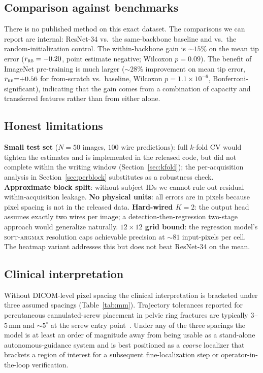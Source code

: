 \documentclass[conference,10pt,letterpaper]{IEEEtran}
\newcommand{\rnt}{ResNet-34}
\newcommand{\softargmax}{\textsc{soft-argmax}}
\begin{document}
\subsection{Comparison against benchmarks}
There is no published method on this exact dataset. The comparisons we
can report are internal: \rnt{} vs.\ the same-backbone baseline and
vs.\ the random-initialization control. The within-backbone gain is
$\sim 15\%$ on the mean tip error ($r_\textsc{rb}=-0.20$, point
estimate negative; Wilcoxon $p{=}0.09$). The benefit of ImageNet
pre-training is much larger ($\sim 28\%$ improvement on mean tip error,
$r_\textsc{rb}{=}{+}0.56$ for from-scratch vs.\ baseline, Wilcoxon
$p{=}1.1{\times}10^{-6}$, Bonferroni-significant), indicating that the
gain comes from a combination of capacity and transferred features
rather than from either alone.

\subsection{Honest limitations}
\textbf{Small test set} ($N{=}50$ images, $100$ wire predictions): full
$k$-fold CV would tighten the estimates and is implemented in the
released code, but did not complete within the writing window
(Section~\ref{sec:kfold}); the per-acquisition analysis in
Section~\ref{sec:perblock} substitutes as a robustness check.
\textbf{Approximate block split}: without subject IDs we cannot rule
out residual within-acquisition leakage. \textbf{No physical units}:
all errors are in pixels because pixel spacing is not in the released
data. \textbf{Hard-wired $K{=}2$}: the output head assumes exactly two
wires per image; a detection-then-regression two-stage approach would
generalize naturally. \textbf{$12{\times}12$ grid bound}: the regression
model's \softargmax{} resolution caps achievable precision at
$\sim 81$ input-pixels per cell. The heatmap variant addresses this
but does not beat \rnt{} on the mean.

\subsection{Clinical interpretation}
\label{sec:clinical}
Without DICOM-level pixel spacing the clinical interpretation is
bracketed under three assumed spacings (Table~\ref{tab:mm}). Trajectory
tolerances reported for percutaneous cannulated-screw placement in
pelvic ring fractures are typically $3$--$5\,$mm and $\sim 5^\circ$ at
the screw entry point~\cite{routt1997,mendel2011}. Under any of the
three spacings the model is at least an order of magnitude away from
being usable as a stand-alone autonomous-guidance system and is best
positioned as a \emph{coarse} localizer that brackets a region of
interest for a subsequent fine-localization step or operator-in-the-loop
verification.
\end{document}
